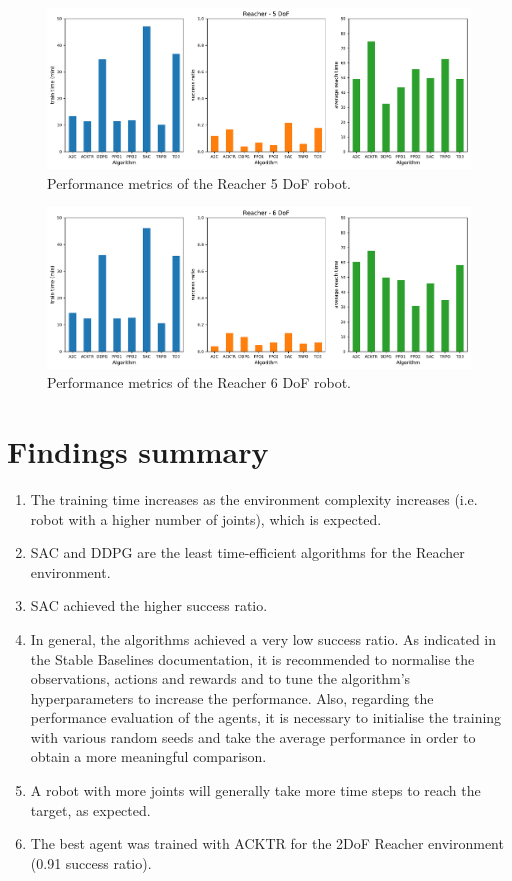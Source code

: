 \documentclass{article}
\begin{document}
\begin{figure}[H]
    \centering
    \includegraphics[width=\textwidth]{../Reacher5Dof-v0/reacher5.pdf}
\caption{Performance metrics of the Reacher 5 DoF robot.}
\end{figure}

\begin{figure}[H]
    \centering
    \includegraphics[width=\textwidth]{../Reacher6Dof-v0/reacher6.pdf}
\caption{Performance metrics of the Reacher 6 DoF robot.}
\end{figure}



\section{Findings summary}

\begin{enumerate}
  \item The training time increases as the environment complexity increases (i.e. robot with a higher number of joints), which is expected.
  \item SAC and DDPG are the least time-efficient algorithms for the Reacher environment.
  \item SAC achieved the higher success ratio.
  \item In general, the algorithms achieved a very low success ratio. As indicated in the Stable Baselines documentation, it is recommended to normalise the observations, actions and rewards and to tune the algorithm's hyperparameters to increase the performance. Also, regarding the performance evaluation of the agents, it is necessary to initialise the training with various random seeds and take the average performance in order to obtain a more meaningful comparison.
  \item A robot with more joints will generally take more time steps to reach the target, as expected.
  \item The best agent was trained with ACKTR for the 2DoF Reacher environment (0.91 success ratio).
\end{enumerate}
\end{document}
